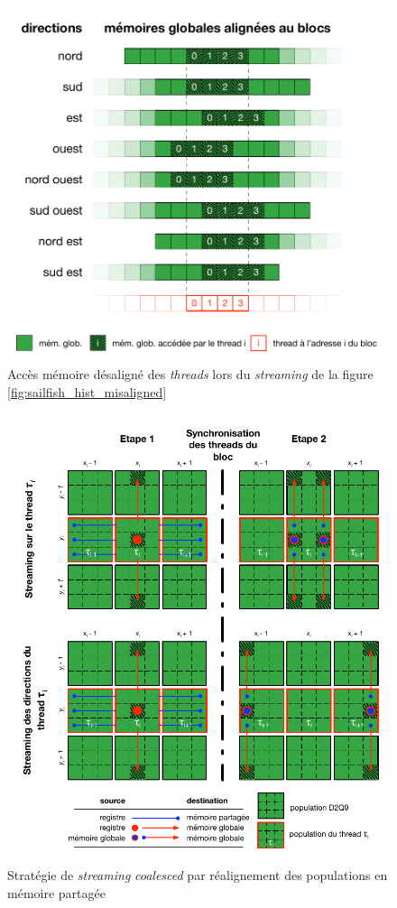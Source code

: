 \begin{figure}[h]
	\centering
	\includegraphics[fbox,scale=0.95]{images/streaming/sailfish_hist_dir_misaligned.pdf}
	\caption{Accès mémoire désaligné des \textit{threads} lors du \textit{streaming} de la figure \ref{fig:sailfish_hist_misaligned}}
	\label{fig:sailfish_hist_dir_misaligned}
\end{figure}

\begin{figure}[h]
	\centering
	\includegraphics[fbox,scale=1.1]{images/streaming/sailfish_hist_ti.pdf}
	\caption{Stratégie de \textit{streaming} \textit{coalesced} par réalignement des populations en mémoire partagée}
	\label{fig:sailfish_hist_ti}
\end{figure}


